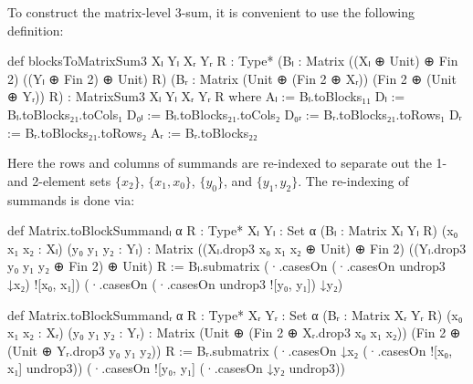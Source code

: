 To construct the matrix-level 3-sum, it is convenient to use the following definition:
\begin{leancode}
def blocksToMatrixSum3 {Xₗ Yₗ Xᵣ Yᵣ R : Type*}
    (Bₗ : Matrix ((Xₗ ⊕ Unit) ⊕ Fin 2)
                 ((Yₗ ⊕ Fin 2) ⊕ Unit) R)
    (Bᵣ : Matrix (Unit ⊕ (Fin 2 ⊕ Xᵣ))
                 (Fin 2 ⊕ (Unit ⊕ Yᵣ)) R) :
    MatrixSum3 Xₗ Yₗ Xᵣ Yᵣ R where
  Aₗ := Bₗ.toBlocks₁₁
  Dₗ := Bₗ.toBlocks₂₁.toCols₁
  D₀ₗ := Bₗ.toBlocks₂₁.toCols₂
  D₀ᵣ := Bᵣ.toBlocks₂₁.toRows₁
  Dᵣ := Bᵣ.toBlocks₂₁.toRows₂
  Aᵣ := Bᵣ.toBlocks₂₂
\end{leancode}
Here the rows and columns of summands are re-indexed to separate out the 1- and 2-element sets $\{x_{2}\}$, $\{x_{1}, x_{0}\}$, $\{y_{0}\}$, and $\{y_{1}, y_{2}\}$. The re-indexing of summands is done via:
\begin{leancode}
def Matrix.toBlockSummandₗ {α R : Type*}
    {Xₗ Yₗ : Set α} (Bₗ : Matrix Xₗ Yₗ R)
    (x₀ x₁ x₂ : Xₗ) (y₀ y₁ y₂ : Yₗ) :
    Matrix
      ((Xₗ.drop3 x₀ x₁ x₂ ⊕ Unit) ⊕ Fin 2)
      ((Yₗ.drop3 y₀ y₁ y₂ ⊕ Fin 2) ⊕ Unit)
      R :=
  Bₗ.submatrix
    (·.casesOn (·.casesOn undrop3 ↓x₂) ![x₀, x₁])
    (·.casesOn (·.casesOn undrop3 ![y₀, y₁]) ↓y₂)
\end{leancode}
\begin{leancode}
def Matrix.toBlockSummandᵣ {α R : Type*}
    {Xᵣ Yᵣ : Set α} (Bᵣ : Matrix Xᵣ Yᵣ R)
    (x₀ x₁ x₂ : Xᵣ) (y₀ y₁ y₂ : Yᵣ) :
    Matrix
      (Unit ⊕ (Fin 2 ⊕ Xᵣ.drop3 x₀ x₁ x₂))
      (Fin 2 ⊕ (Unit ⊕ Yᵣ.drop3 y₀ y₁ y₂))
      R :=
  Bᵣ.submatrix
    (·.casesOn ↓x₂ (·.casesOn ![x₀, x₁] undrop3))
    (·.casesOn ![y₀, y₁] (·.casesOn ↓y₂ undrop3))
\end{leancode}
\begin{comment}
For example, \texttt{MatrixSum3} can thus be constructed from two standard representations as follows:
\begin{leancode}
abbrev matrixSum3aux {α : Type*} [DecidableEq α]
    (Sₗ Sᵣ : StandardRepr α Z2)
    (x₀ₗ x₁ₗ x₂ₗ : Sₗ.X) (y₀ₗ y₁ₗ y₂ₗ : Sₗ.Y)
    (x₀ᵣ x₁ᵣ x₂ᵣ : Sᵣ.X) (y₀ᵣ y₁ᵣ y₂ᵣ : Sᵣ.Y) :
    MatrixSum3 (Sₗ.X.drop3 x₀ₗ x₁ₗ x₂ₗ)
      (Sₗ.Y.drop3 y₀ₗ y₁ₗ y₂ₗ)
      (Sᵣ.X.drop3 x₀ᵣ x₁ᵣ x₂ᵣ)
      (Sᵣ.Y.drop3 y₀ᵣ y₁ᵣ y₂ᵣ) Z2 :=
  blocksToMatrixSum3
    (Sₗ.B.toBlockSummandₗ x₀ₗ x₁ₗ x₂ₗ y₀ₗ y₁ₗ y₂ₗ)
    (Sᵣ.B.toBlockSummandᵣ x₀ᵣ x₁ᵣ x₂ᵣ y₀ᵣ y₁ᵣ y₂ᵣ)
\end{leancode}
Similar to \texttt{MatrixSum3}, this simplifies the upcoming definitions by hiding the inner workings of the construction inside the definitions, and thus allows us to work with higher-level objects in the implementation. Although \texttt{matrixSum3aux} does not appear in the implementation of the definition of the 3-sum on the level of standard representations, it is frequently used as a compact equivalent representation in proofs of technical lemmas.

\todo[inline]{@Martin note that \texttt{matrixSum3aux} is no longer part of the definition of 3-sum for standard representations}
Thanks for inlining it! I think now we can remove it from the paper.
\end{comment}


